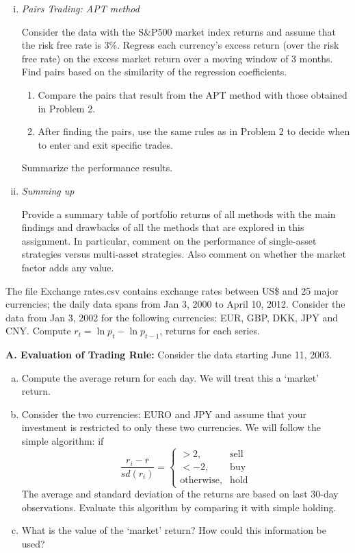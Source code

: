 \begin{enumerate}[(i)]
	\item {\it Pairs Trading: APT method}

Consider the data with the S\&P500 market index returns and assume that the risk free rate is 3\%. Regress each currency's excess return (over the risk free rate) on the excess market return over a moving window of 3 months. Find pairs based on the similarity of the regression coefficients.
	\begin{enumerate}
	\item Compare the pairs that result from the APT method with those obtained in Problem 2.
	\item After finding the pairs, use the same rules as in Problem 2 to decide when to enter and exit specific trades.
	\end{enumerate}
Summarize the performance results.

	\item {\it Summing up}

Provide a summary table of portfolio returns of all methods with the main findings and drawbacks of all the methods that are explored in this assignment. In particular, comment on the performance of single-asset strategies versus multi-asset strategies. Also comment on whether the market factor adds any value. \twomedskip
	\end{enumerate}


\prob The file Exchange rates.csv contains exchange rates between US\$ and 25 major currencies; the daily data spans from Jan 3, 2000 to April 10, 2012. Consider the data from Jan 3, 2002 for the following currencies: EUR, GBP, DKK, JPY and CNY. Compute $r_t = \ln{p_t} - \ln{p_{t-1}}$, returns for each series. \twomedskip


\indent\textbf{A. Evaluation of Trading Rule:} Consider the data starting June 11, 2003.
	\begin{enumerate}[(a)]
	\item Compute the average return for each day. We will treat this a `market' return.
	\item Consider the two currencies: EURO and JPY and assume that your investment is restricted to only these two currencies. We will follow the simple algorithm: if 
	\[
	\frac{r_i - \overline{r}}{sd(r_i)}=
	\begin{cases}
	>2, & \text{sell} \\
	< -2, & \text{buy} \\
	\text{otherwise}, & \text{hold}
	\end{cases}
	\]
The average and standard deviation of the returns are based on last 30-day observations. Evaluate this algorithm by comparing it with simple holding.
	\item What is the value of the `market' return? How could this information be used?
\end{enumerate}


